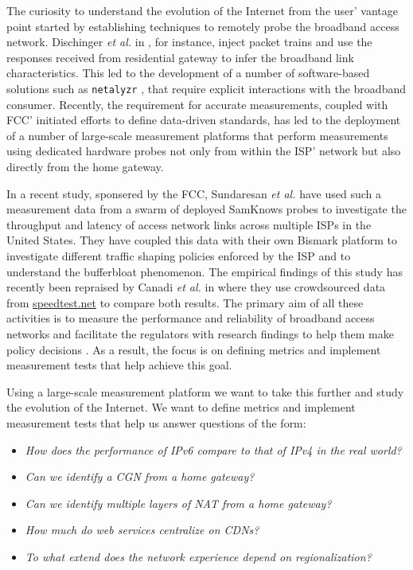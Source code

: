 The curiosity to understand the evolution of the Internet from the user'
vantage point started by establishing techniques to remotely probe the
broadband access network. Dischinger \emph{et al.} in \cite{dischinger:2007},
for instance, inject packet trains and use the responses received from
residential gateway to infer the broadband link characteristics. This led to
the development of a number of software-based solutions such as
\texttt{netalyzr} \cite{kreibich:2010}, that require explicit interactions
with the broadband consumer.  Recently, the requirement for accurate
measurements, coupled with \ac{FCC}' initiated efforts to define data-driven
standards, has led to the deployment of a number of large-scale measurement
platforms that perform measurements using dedicated hardware probes not only
from within the \ac{ISP}' network but also directly from the home gateway.

In a recent study, sponsered by the \ac{FCC}, Sundaresan \emph{et al.}
\cite{sundaresan:2011} have used such a measurement data from a swarm of
deployed SamKnows probes to investigate the throughput and latency of access
network links across multiple \ac{ISP}s in the United States. They have
coupled this data with their own Bismark platform \cite{sundaresan:2012} to
investigate different traffic shaping policies enforced by the \ac{ISP} and to
understand the bufferbloat phenomenon. The empirical findings of this study
has recently been repraised by Canadi \emph{et al.} in \cite{canadi:2012}
where they use crowdsourced data from \url{speedtest.net} to compare both
results. The primary aim of all these activities is to measure the performance
and reliability of broadband access networks and facilitate the regulators
with research findings to help them make policy decisions
\cite{draft-schulzrinne-lmap-requirements-00}.  As a result, the focus is on
defining metrics and implement measurement tests that help achieve this goal.

Using a large-scale measurement platform we want to take this further and
study the evolution of the Internet. We want to define metrics and implement
measurement tests that help us answer questions of the form:

\begin{itemize}
  \item \emph{How does the performance of IPv6 compare to that of IPv4 in the real world?}
  \item \emph{Can we identify a \ac{CGN} from a home gateway?}
  \item \emph{Can we identify multiple layers of NAT from a home gateway?}
  \item \emph{How much do web services centralize on \ac{CDN}s?}
  \item \emph{To what extend does the network experience depend on regionalization?}
\end{itemize}

